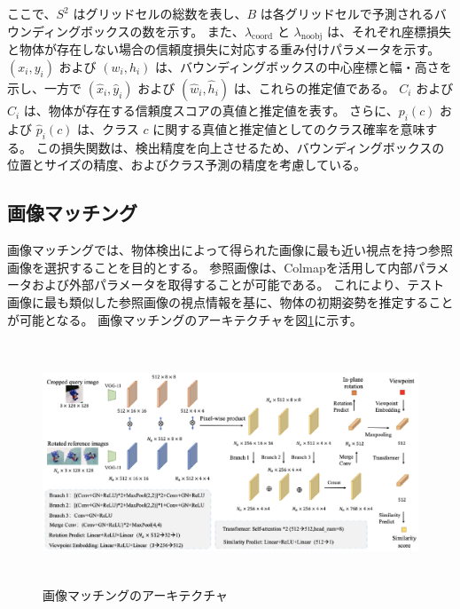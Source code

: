 ここで、$S^2$ はグリッドセルの総数を表し、$B$ は各グリッドセルで予測されるバウンディングボックスの数を示す。
また、$\lambda_{\text{coord}}$ と $\lambda_{\text{noobj}}$ は、それぞれ座標損失と物体が存在しない場合の信頼度損失に対応する重み付けパラメータを示す。
$(x_i, y_i)$ および $(w_i, h_i)$ は、バウンディングボックスの中心座標と幅・高さを示し、一方で $(\hat{x}_i, \hat{y}_i)$ および $(\hat{w}_i, \hat{h}_i)$ は、これらの推定値である。
$C_i$ および $\hat{C}_i$ は、物体が存在する信頼度スコアの真値と推定値を表す。
さらに、$p_i(c)$ および $\hat{p}_i(c)$ は、クラス $c$ に関する真値と推定値としてのクラス確率を意味する。
この損失関数は、検出精度を向上させるため、バウンディングボックスの位置とサイズの精度、およびクラス予測の精度を考慮している。

\subsection{画像マッチング}
画像マッチングでは、物体検出によって得られた画像に最も近い視点を持つ参照画像を選択することを目的とする。
参照画像は、Colmapを活用して内部パラメータおよび外部パラメータを取得することが可能である。
これにより、テスト画像に最も類似した参照画像の視点情報を基に、物体の初期姿勢を推定することが可能となる。
画像マッチングのアーキテクチャを図\ref{fig:f5}に示す。
\begin{figure}[htbt]
	\centering
	 \includegraphics[height=72mm]{Figure/selector_arc.eps}
	 \caption{画像マッチングのアーキテクチャ}
	 \label{fig:f5}
\end{figure}

